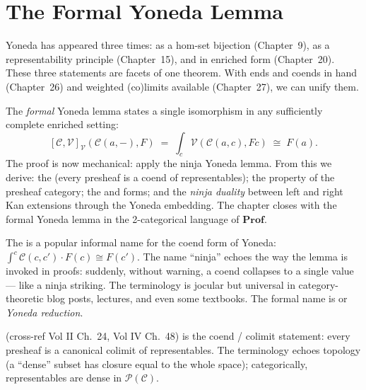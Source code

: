 
\chapter{The Formal Yoneda Lemma}

\begin{overviewbox}
Yoneda has appeared three times: as a hom-set bijection (Chapter~9), as a
representability principle (Chapter~15), and in enriched form (Chapter~20).
These three statements are facets of one theorem. With ends and coends in
hand (Chapter~26) and weighted (co)limits available (Chapter~27), we can
unify them.

The \emph{formal} Yoneda lemma states a single isomorphism in any sufficiently
complete enriched setting:
\[
  [\mathcal{C}, \mathcal{V}]_\mathcal{V}(\mathcal{C}(a, -), F)
  \;=\; \int_c \mathcal{V}(\mathcal{C}(a, c), F c)
  \;\cong\; F(a).
\]
The proof is now mechanical: apply the ninja Yoneda lemma. From this we
derive: the  (every presheaf is a coend of representables);
the  property of the presheaf category; the
 and  forms; and the \emph{ninja
duality} between left and right Kan extensions through the Yoneda embedding.
The chapter closes with the formal Yoneda lemma in the 2-categorical
language of $\mathbf{Prof}$.
\end{overviewbox}


\begin{nameorigin}
The  is a popular informal name for the coend
form of Yoneda: $\int^c \mathcal{C}(c, c') \cdot F(c) \cong F(c')$.
The name ``ninja'' echoes the way the lemma is invoked in proofs:
suddenly, without warning, a coend collapses to a single value — like
a ninja striking. The terminology is jocular but universal in
category-theoretic blog posts, lectures, and even some textbooks. The
formal name is  or \emph{Yoneda reduction}.

 (cross-ref Vol II Ch.~24, Vol IV Ch.~48) is the
coend / colimit statement: every presheaf is a canonical colimit of
representables. The terminology echoes topology (a ``dense'' subset has
closure equal to the whole space); categorically, representables are
dense in $\mathcal{P}(\mathcal{C})$.
\end{nameorigin}

